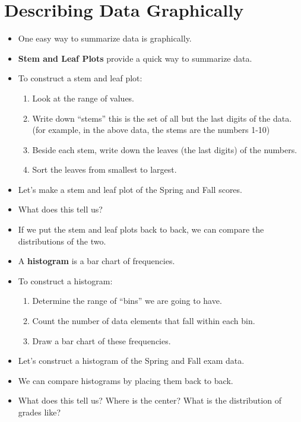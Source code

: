 \documentclass{article}
\begin{document}
\section{Describing Data Graphically}
\begin{itemize}
    \item One easy way to summarize data is graphically.
    \item \textbf{Stem and Leaf Plots} provide a quick way to summarize data.
    \item To construct a stem and leaf plot:
    \begin{enumerate}
        \item Look at the range of values.
        \item Write down ``stems'' this is the set of all but the last digits of the data.
           (for example, in the above data, the stems are the numbers 1-10)
        \item Beside each stem, write down the leaves (the last digits) of the numbers.
        \item Sort the leaves from smallest to largest.
    \end{enumerate}
    \item Let's make a stem and leaf plot of the Spring and Fall scores.
    \item What does this tell us?
    \item If we put the stem and leaf plots back to back, we can compare the distributions of the two.
    \item A \textbf{histogram} is a bar chart of frequencies.
    \item To construct a histogram:
    \begin{enumerate}
        \item Determine the range of ``bins'' we are going to have.
        \item Count the number of data elements that fall within each bin.
        \item Draw a bar chart of these frequencies.
    \end{enumerate}
    \item Let's construct a histogram of the Spring and Fall exam data.
    \item We can compare histograms by placing them back to back.
    \item What does this tell us?  Where is the center?  What is the distribution of grades like?
\end{itemize}
\end{document}
